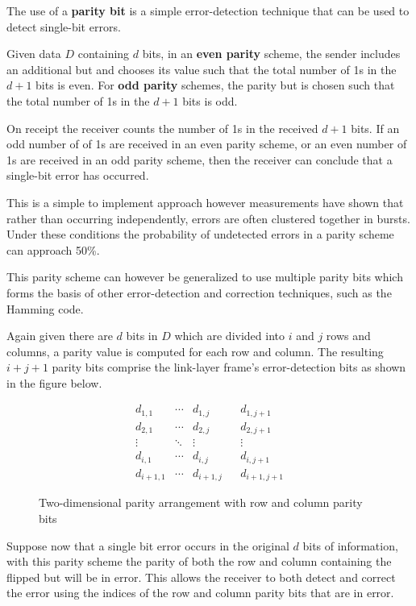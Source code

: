 \documentclass[12pt letter]{report}
\begin{document}
The use of a \textbf{parity bit} is a simple error-detection
technique that can be used to detect single-bit errors.

Given data $D$ containing $d$ bits, in an \textbf{even parity}
scheme, the sender includes an additional but and chooses its value
such that the total number of 1s in the $d + 1$ bits is even. For
\textbf{odd parity} schemes, the parity but is chosen such that the
total number of 1s in the $d + 1$ bits is odd.

On receipt the receiver counts the number of 1s in the received $d +
1$ bits. If an odd number of of 1s are received in an even parity
scheme, or an even number of 1s are received in an odd parity scheme,
then the receiver can conclude that a single-bit error has occurred.

This is a simple to implement approach however measurements have
shown that rather than occurring independently, errors are often
clustered together in bursts. Under these conditions the probability
of undetected errors in a parity scheme can approach 50\%.

This parity scheme can however be generalized to use multiple parity
bits which forms the basis of other error-detection and correction
techniques, such as the Hamming code.

Again given there are $d$ bits in $D$ which are divided into $i$ and
$j$ rows and columns, a parity value is computed for each row and
column. The resulting $i + j + 1$ parity bits comprise the link-layer
frame's error-detection bits as shown in the figure below.

\begin{figure}[H]
  \centering
  \[
    \begin{array}{cccc|c}
      d_{1,1} & \cdots & d_{1,j} & & d_{1,j+1} \\
      d_{2,1} & \cdots & d_{2,j} & & d_{2,j+1} \\
      \vdots  & \ddots & \vdots  & & \vdots    \\
      d_{i,1} & \cdots & d_{i,j} & & d_{i,j+1} \\ \hline
      d_{i+1,1} & \cdots & d_{i+1,j} & & d_{i+1,j+1}
    \end{array}
  \]
  \caption{Two-dimensional parity arrangement with row and column parity bits}
  \label{fig:parity}
\end{figure}

Suppose now that a single bit error occurs in the original $d$ bits
of information, with this parity scheme the parity of both the row
and column containing the flipped but will be in error. This allows
the receiver to both detect and correct the error using the indices
of the row and column parity bits that are in error.
\end{document}
